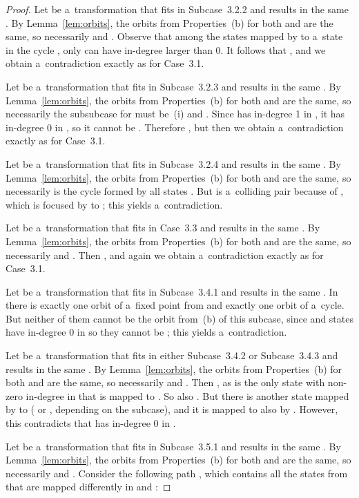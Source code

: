 \documentclass{amsart}
\begin{document}
\begin{proof}
Let  be a~transformation that fits in Subcase~3.2.2 and results in the same .
By Lemma~\ref{lem:orbits}, the orbits from Properties~(b) for both  and  are the same, so necessarily  and .
Observe that among the states mapped by  to a~state in the cycle , only  can have in-degree larger than 0.
It follows that , and we obtain a~contradiction exactly as for Case~3.1.

Let  be a~transformation that fits in Subcase~3.2.3 and results in the same .
By Lemma~\ref{lem:orbits}, the orbits from Properties~(b) for both  and  are the same, so necessarily the subsubcase for  must be~(i) and .
Since  has in-degree 1 in , it has in-degree 0 in , so it cannot be .
Therefore , but then we obtain a~contradiction exactly as for Case~3.1.

Let  be a~transformation that fits in Subcase~3.2.4 and results in the same .
By Lemma~\ref{lem:orbits}, the orbits from Properties~(b) for both  and  are the same, so necessarily  is the cycle formed by all states .
But  is a~colliding pair because of , which is focused by  to ; this yields a~contradiction.

Let  be a~transformation that fits in Case~3.3 and results in the same .
By Lemma~\ref{lem:orbits}, the orbits from Properties~(b) for both  and  are the same, so necessarily  and .
Then , and again we obtain a~contradiction exactly as for Case~3.1.

Let  be a~transformation that fits in Subcase~3.4.1 and results in the same .
In  there is exactly one orbit of a~fixed point from  and exactly one orbit of a~cycle.
But neither of them cannot be the orbit from~(b) of this subcase, since  and states  have in-degree 0 in  so they cannot be ; this yields a~contradiction.

Let  be a~transformation that fits in either Subcase~3.4.2 or Subcase~3.4.3 and results in the same .
By Lemma~\ref{lem:orbits}, the orbits from Properties~(b) for both  and  are the same, so necessarily  and .
Then , as  is the only state with non-zero in-degree in  that is mapped to .
So also .
But there is another state mapped by  to  ( or , depending on the subcase), and it is mapped to  also by .
However, this contradicts that  has in-degree 0 in .

Let  be a~transformation that fits in Subcase~3.5.1 and results in the same .
By Lemma~\ref{lem:orbits}, the orbits from Properties~(b) for both  and  are the same, so necessarily  and .
Consider the following path , which contains all the states from  that are mapped differently in  and :


\end{proof}
\end{document}
